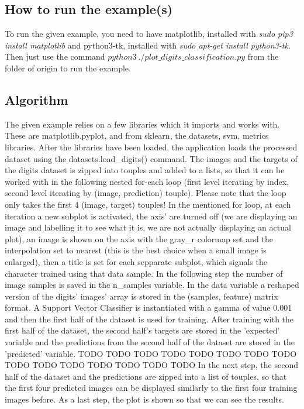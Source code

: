 \documentclass[a4paper,10pt]{report}
\begin{document}
 \subsection{How to run the example(s)}
 To run the given example, you need to have matplotlib, installed with \textit{sudo pip3 install matplotlib} and python3-tk, installed with \textit{sudo apt-get install python3-tk}. Then just use the command $python3\ ./plot\_digits\_classification.py$ from the folder of origin to run the example.
 
 \subsection{Algorithm}
 The given example relies on a few libraries which it imports and works with. These are matplotlib.pyplot, and from sklearn, the datasets, svm, metrics libraries. After the libraries have been loaded, the application loads the processed dataset using the datasets.load_digits() command. 
 The images and the targets of the digits dataset is zipped into touples and added to a lists, so that it can be worked with in the following nested for-each loop (first level iterating by index, second level iterating by (image, prediction) touple). Please note that the loop only takes the first 4 (image, target) touples! In the mentioned for loop, at each iteration a new subplot is activated, the axis' are turned off (we are displaying an image and labelling it to see what it is, we are not actually displaying an actual plot), an image is shown on the axis with the gray_r colormap set and the interpolation set to nearest (this is the best choice when a small image is enlarged), then a title is set for each sepparate subplot, which signals the character trained using that data sample.
 In the following step the number of image samples is saved in the n_samples variable. In the data variable a reshaped version of the digits' images' array is stored in the (samples, feature) matrix format. A Support Vector Classifier is instantiated with a gamma of value 0.001 and then the first half of the dataset is used for training.
 After training with the first half of the dataset, the second half's targets are stored in the 'expected' variable and the predictions from the second half of the dataset are stored in the 'predicted' variable.
 TODO  TODO  TODO  TODO  TODO  TODO  TODO  TODO  TODO  TODO  TODO  TODO  TODO  TODO  TODO 
 In the next step, the second half of the dataset and the predictions are zipped into a list of touples, so that the first four predicted images can be displayed similarly to the first four training images before.
 As a last step, the plot is shown so that we can see the results.
 
\end{document}
